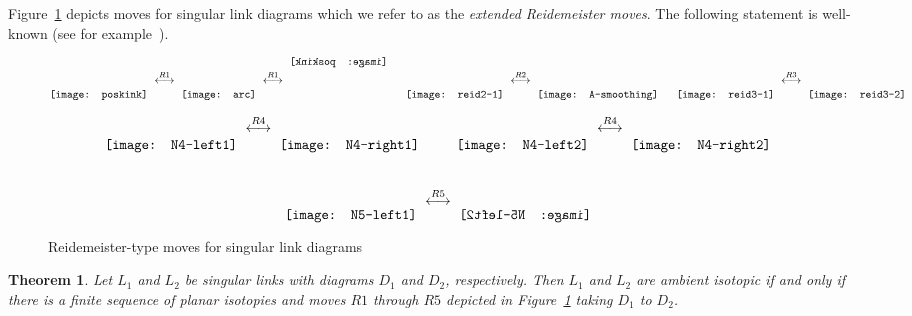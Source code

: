 \documentclass{amsart}\usepackage{amsfonts, amsmath, amssymb}\usepackage{graphicx, epic, epsf, enumerate, stmaryrd}
\newtheorem{theorem}{Theorem}
\theoremstyle{definition}
\numberwithin{equation}{section}
\begin{document}
Figure~\ref{fig:extended-Reid} depicts moves for singular link diagrams which we refer to as the \textit{extended Reidemeister moves}. The following statement is well-known (see for example~\cite{Ka1, Ka2}).
\begin{figure}[ht]
\[\raisebox{-13pt}{\texttt{[image: poskink]}}\,\,  \stackrel{R1}{\longleftrightarrow} \,\, \raisebox{-13pt}{\texttt{[image: arc]}} \,\, \stackrel{R1}{\longleftrightarrow} \,\,   \reflectbox{\raisebox{17pt}{\texttt{[image: poskink]}}} \,\,\quad\,\, 
 \raisebox{-13pt}{\texttt{[image: reid2-1]}} \,\, \stackrel{R2}{\longleftrightarrow} \,\, \raisebox{-13pt}{\texttt{[image: A-smoothing]}} \,\, \quad \,\, 
\raisebox{-13pt}{\texttt{[image: reid3-1]}} \,\, \stackrel{R3}{\longleftrightarrow} \,\,   \raisebox{-13pt}{\texttt{[image: reid3-2]}}\]

\[  \raisebox{-12pt}{\texttt{[image: N4-left1]}}\,\, \stackrel{R4}{\longleftrightarrow} \,\, \raisebox{-12pt}{\texttt{[image: N4-right1]}} \,\, \qquad \,\,  \raisebox{-12pt}{\texttt{[image: N4-left2]}} \,\, \stackrel{R4}{\longleftrightarrow}\,\,  \raisebox{-12pt}{\texttt{[image: N4-right2]}} \]\\
\[ \raisebox{-10pt}{\texttt{[image: N5-left1]}}\,\,\stackrel{R5}{ \longleftrightarrow} \,\,\reflectbox{\raisebox{-10pt}{\texttt{[image: N5-left2]}}}\]
\caption{Reidemeister-type moves for singular link diagrams}\label{fig:extended-Reid}
\end{figure}

\begin{theorem}\label{thm:isotopies}
Let $L_1$ and $L_2$ be singular links with diagrams $D_1$ and $D_2$, respectively. Then $L_1$ and $L_2$ are ambient isotopic if and only if there is a finite sequence of planar isotopies and moves $R1$ through $R5$ depicted in Figure~\ref{fig:extended-Reid} taking $D_1$ to $D_2$.
\end{theorem}
\end{document}
